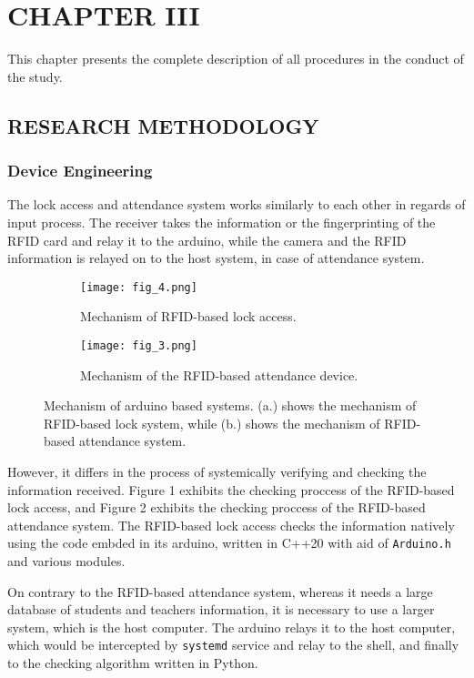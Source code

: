 \documentclass[12pt]{article}
\begin{document}
\newpage
\section*{CHAPTER III\centering}

This chapter presents the complete description of all procedures in the conduct of the study. 

\subsection*{RESEARCH METHODOLOGY\centering}

\subsubsection*{Device Engineering}
\doublespacing

The lock access and attendance system works similarly to each other in regards of input process. The receiver takes the information or the fingerprinting of the RFID card and relay it to the arduino, while the camera and the RFID information is relayed on to the host system, in case of attendance system.

	\begin{figure}[h!]
		\begin{subfigure}{.5\textwidth}
			\centering
			\texttt{[image: fig\_4.png]}
			\caption{Mechanism of RFID-based lock access.}
			\label{fig:sub1}
		\end{subfigure}
		\hfill
		\begin{subfigure}{.5\textwidth}
			\centering
			\texttt{[image: fig\_3.png]}
			\caption{Mechanism of the RFID-based attendance device.}
			\label{fig:sub1}
		\end{subfigure}
		\caption{Mechanism of arduino based systems. (a.) shows the mechanism of RFID-based lock system, while (b.) shows the mechanism of RFID-based attendance system.}
	\end{figure}

However, it differs in the process of systemically verifying and checking the information received. Figure 1 exhibits the checking proccess of the RFID-based lock access, and Figure 2 exhibits the checking proccess of the RFID-based attendance system. The RFID-based lock access checks the information natively using the code embded in its arduino, written in C++20 with aid of \texttt{Arduino.h} and various modules. 

On contrary to the RFID-based attendance system, whereas it needs a large database of students and teachers information, it is necessary to use a larger system, which is the host computer. The arduino relays it to the host computer, which would be intercepted by \texttt{systemd} service and relay to the shell, and finally to the checking algorithm written in Python.
\end{document}
